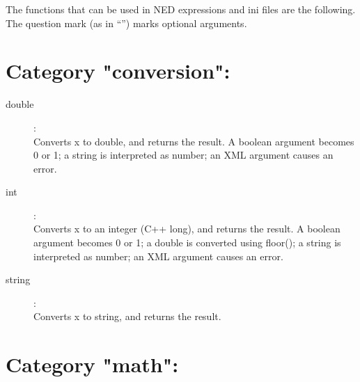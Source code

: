 \label{cha:ned-functions}

The functions that can be used in NED expressions and ini files are the
following. The question mark (as in ``'') marks optional arguments.

%
%

\section{Category "conversion":}
\label{sec:ned-functions:category-conversion}

\begin{description}
\item[double]:  \\
    Converts x to double, and returns the result. A boolean argument becomes 0 or 1; a string is interpreted as number; an XML argument causes an error.
\item[int]:  \\
    Converts x to an integer (C++ long), and returns the result. A boolean argument becomes 0 or 1; a double is converted using floor(); a string is interpreted as number; an XML argument causes an error.
\item[string]:  \\
    Converts x to string, and returns the result.

\end{description}

\section{Category "math":}
\label{sec:ned-functions:category-math}

